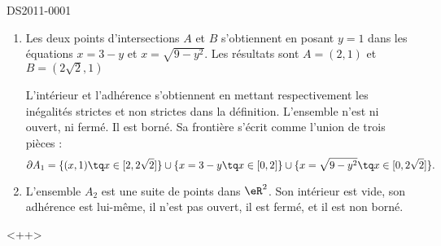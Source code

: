 \begin{corrige}{DS2011-0001}
  
    \begin{enumerate}
        \item
            


    \begin{center}
   
    \end{center}


    Les deux points d'intersections \( A\) et \( B\) s'obtiennent en posant \( y=1\) dans les équations \( x=3-y\) et \( x=\sqrt{9-y^2}\). Les résultats sont \( A=(2,1)\) et \( B=(2\sqrt{2},1)\)

    L'intérieur et l'adhérence s'obtiennent en mettant respectivement les inégalités strictes et non strictes dans la définition. L'ensemble n'est ni ouvert, ni fermé. Il est borné. Sa frontière s'écrit comme l'union de trois pièces :
    \begin{equation}
        \partial A_1=\{ (x,1)\tq x\in\mathopen[ 2,2\sqrt{2}  \mathclose] \}\cup\{ x=3-y\tq x\in\mathopen[ 0 , 2 \mathclose] \}\cup\{ x=\sqrt{9-y^2}\tq x\in\mathopen[ 0 , 2\sqrt{2} \mathclose] \}.
    \end{equation}

\item

    L'ensemble \( A_2\) est une suite de points dans \( \eR^2\). Son intérieur est vide, son adhérence est lui-même, il n'est pas ouvert, il est fermé, et il est non borné.
    \end{enumerate}
    <++>

\end{corrige}
